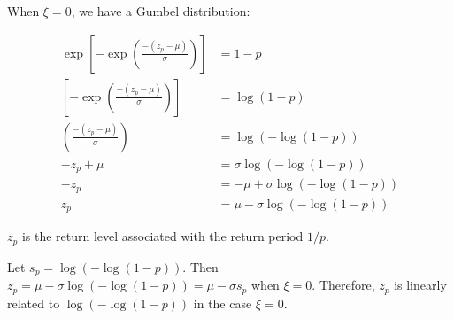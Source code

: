 \documentclass[
  letterpaper,
  DIV=11,
  numbers=noendperiod,
  oneside]{scrartcl}
\begin{document}
\begin{tcolorbox}
When \(\xi = 0\), we have a Gumbel distribution:

\[\begin{split}\exp\left[ -\exp\left( \frac{-(z_p - \mu)}{\sigma}\right)\right] &= 1-p\\
\left[ -\exp\left( \frac{-(z_p - \mu)}{\sigma}\right)\right] &=\log(1-p)\\
\left( \frac{-(z_p - \mu)}{\sigma}\right) &= \log(-\log(1-p))\\
-z_p + \mu &= \sigma\log(-\log(1-p))\\
-z_p &= -\mu + \sigma\log(-\log(1-p))\\
z_p &= \mu - \sigma\log(-\log(1-p))\end{split}\]

\(z_p\) is the return level associated with the return period \(1/p\).

Let \(s_p = \log(-\log(1-p))\). Then
\(z_p = \mu - \sigma\log(-\log(1-p)) = \mu - \sigma s_p\) when
\(\xi = 0\). Therefore, \(z_p\) is linearly related to
\(\log(-\log(1-p))\) in the case \(\xi = 0\).

\end{tcolorbox}
\end{document}
